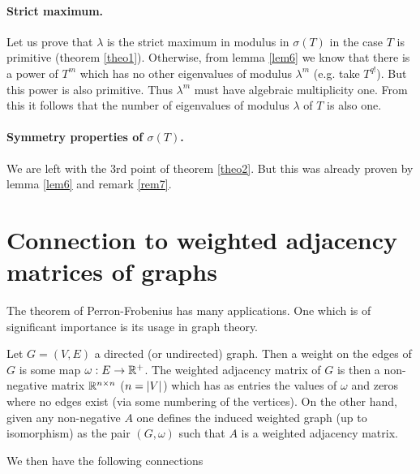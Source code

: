 \documentclass{article}
\begin{document}
\paragraph{Strict maximum.} Let us prove that $\lambda$ is the strict maximum in modulus in $\sigma(T)$ in the case $T$ is primitive (theorem \ref{theo1}). Otherwise, from lemma \ref{lem6} we know that there is a power of $T^m$ which has no other eigenvalues of modulus $\lambda^m$ (e.g. take $T^{q!}$). But this power is also primitive. Thus $\lambda^m$ must have algebraic multiplicity one. From this it follows that the number of eigenvalues of modulus $\lambda$ of $T$ is also one.

\paragraph{Symmetry properties of $\sigma(T)$.} We are left with the 3rd point of theorem \ref{theo2}. But this was already proven by lemma \ref{lem6} and remark \ref{rem7}.

\section{Connection to weighted adjacency matrices of graphs}

The theorem of Perron-Frobenius has many applications. One which is of significant importance is its usage in graph theory.

\begin{definition}
Let $G=(V,E)$ a directed (or undirected) graph. Then a weight on the edges of $G$ is some map $\omega:E\to \mathbb{R}^+$. The weighted adjacency matrix of $G$ is then a non-negative matrix $\mathbb{R}^{n\times n}$ ($n=\left| V\right|$) which has as entries the values of $\omega$ and zeros where no edges exist (via some numbering of the vertices).
On the other hand, given any non-negative $A$ one defines the induced weighted graph (up to isomorphism) as the pair $(G,\omega)$ such that $A$ is a weighted adjacency matrix.
\end{definition}

We then have the following connections
\end{document}
